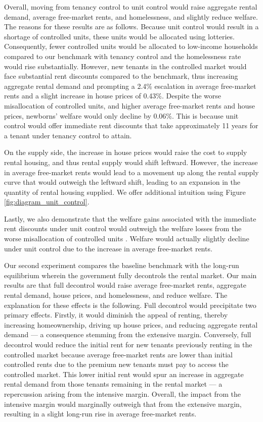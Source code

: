 \documentclass[parskip=full]{article}
\begin{document}
Overall, moving from tenancy control to unit control would raise aggregate rental demand, average free-market rents, and homelessness, and slightly reduce welfare. The reasons for these results are as follows. Because unit control would result in a shortage of controlled units, these units would be allocated using lotteries. Consequently, fewer controlled units would be allocated to low-income households compared to our benchmark with tenancy control and the homelessness rate would rise substantially. However, new tenants in the controlled market would face substantial rent discounts compared to the benchmark, thus increasing aggregate rental demand and prompting a 2.4\% escalation in average free-market rents and a slight increase in house prices of 0.43\%. Despite the worse misallocation of controlled units, and higher average free-market rents and house prices, newborns' welfare would only decline by 0.06\%. This is because unit control would offer immediate rent discounts that take approximately 11 years for a tenant under tenancy control to attain. 

On the supply side, the increase in house prices would raise the cost to supply rental housing, and thus rental supply would shift leftward. However, the increase in average free-market rents would lead to a movement up along the rental supply curve that would outweigh the leftward shift, leading to an expansion in the quantity of rental housing supplied. We offer additional intuition using Figure \ref{fig:diagram_unit_control}.

Lastly, we also demonstrate that the welfare gains associated with the immediate rent discounts under unit control would outweigh the welfare losses from the worse misallocation of controlled units \citep{gl-2003}. Welfare would actually slightly decline under unit control due to the increase in average free-market rents.

Our second experiment compares the baseline benchmark with the long-run equilibrium wherein the government fully decontrols the rental market. Our main results are that full decontrol would raise average free-market rents, aggregate rental demand, house prices, and homelessness, and reduce welfare. The explanation for these effects is the following. Full decontrol would precipitate two primary effects. Firstly, it would diminish the appeal of renting, thereby increasing homeownership, driving up house prices, and reducing aggregate rental demand --- a consequence stemming from the extensive margin. Conversely, full decontrol would reduce the initial rent for new tenants previously renting in the controlled market because average free-market rents are lower than initial controlled rents due to the premium new tenants must pay to access the controlled market. This lower initial rent would spur an increase in aggregate rental demand from those tenants remaining in the rental market --- a repercussion arising from the intensive margin. Overall, the impact from the intensive margin would marginally outweigh that from the extensive margin, resulting in a slight long-run rise in average free-market rents. 
\end{document}
